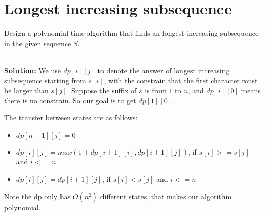 \section{Longest increasing subsequence}
Design a polynomial time algorithm that finds an longest increasing subsequence in the given sequence $S$.

\ \\{\bf Solution:} We use $dp[i][j]$ to denote the answer of longest increasing subsequence starting from $s[i]$, with the constrain that the first character must be larger than $s[j]$. Suppose the suffix of $s$ is from $1$ to $n$, and $dp[i][0]$ means there is no constrain. So our goal is to get $dp[1][0]$.

The transfer between states are as follows:
\begin{itemize}
\item $dp[n+1][j] = 0$
\item $dp[i][j] = max(1+dp[i+1][i], dp[i+1][j])$, if $s[i] >= s[j]$ and $i <= n$
\item $dp[i][j] = dp[i+1][j]$, if $s[i] < s[j]$ and $i <= n$
\end{itemize}

Note the dp only has $O(n^2)$ different states, that makes our algorithm polynomial.